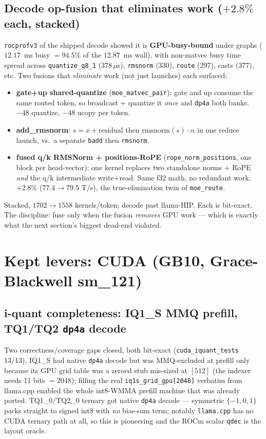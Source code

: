 \documentclass[11pt]{article}
\newcommand{\dpa}{\texttt{dp4a}}
\begin{document}
\subsection{Decode op-fusion that eliminates work ($+2.8\%$ each, stacked)}
\texttt{rocprofv3} of the shipped decode showed it is \textbf{GPU-busy-bound} under graphs
($12.17$~ms busy $=94.5\%$ of the $12.87$~ms wall), with non-matvec busy time spread across
\texttt{quantize\_q8\_1} (378\,$\mu$s), \texttt{rmsnorm} (330), \texttt{route} (297), casts (377),
etc. Two fusions that \emph{eliminate} work (not just launches) each surfaced:
\begin{itemize}[noitemsep]
  \item \textbf{gate+up shared-quantize} (\texttt{moe\_matvec\_pair}): gate and up consume the same
        routed token, so broadcast + quantize it \emph{once} and \dpa{} both banks. $-48$ quantize,
        $-48$ ucopy per token.
  \item \textbf{add\_rmsnorm}: $s = x + \text{residual}$ then $\text{rmsnorm}(s)\cdot\alpha$ in one
        reduce launch, vs.\ a separate \texttt{badd} then \texttt{rmsnorm}.
  \item \textbf{fused q/k RMSNorm + positions-RoPE} (\texttt{rope\_norm\_positions}, one block per
        head-vector): one kernel replaces two standalone norms + RoPE \emph{and} the q/k
        intermediate write+read. Same f32 math, no redundant work. $+2.8\%$ ($77.4\to79.5$ T/s),
        the true-elimination twin of \texttt{moe\_route}.
\end{itemize}
Stacked, $1702\to1558$ kernels/token; decode past llama-HIP. Each is bit-exact. The discipline:
fuse only when the fusion \emph{removes} GPU work --- which is exactly what the next section's
biggest dead-end violated.

\section{Kept levers: CUDA (GB10, Grace-Blackwell sm\_121)}
\label{sec:cuda}
\subsection{i-quant completeness: IQ1\_S MMQ prefill, TQ1/TQ2 \dpa{} decode}
Two correctness/coverage gaps closed, both bit-exact (\texttt{cuda\_iquant\_tests} 13/13). IQ1\_S had
native \dpa{} decode but was MMQ-excluded at prefill only because its GPU grid table was a zeroed
stub mis-sized at $[512]$ (the indexer needs 11 bits $=2048$); filling the real
\texttt{iq1s\_grid\_gpu[2048]} verbatim from llama.cpp enabled the whole int8-WMMA prefill machine
that was already ported. TQ1\_0/TQ2\_0 ternary got native \dpa{} decode --- symmetric $\{-1,0,1\}$
packs straight to signed int8 with \emph{no} bias-sum term; notably \texttt{llama.cpp} has no CUDA
ternary path at all, so this is pioneering and the ROCm scalar \texttt{qdec} is the layout oracle.
\end{document}
